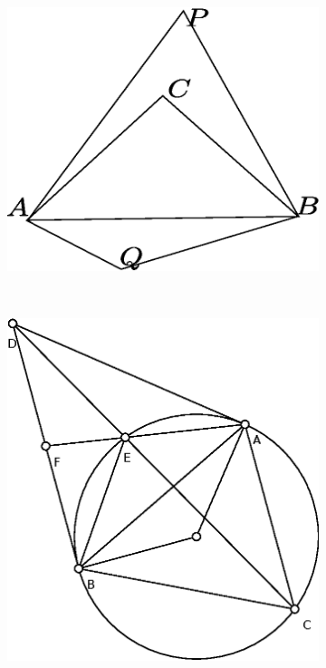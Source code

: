 \documentclass[12pt]{article}
\begin{document}
\begin{enumerate}
\begin{enumerate}[label=(\roman*)]
    \begin{figure}[!ht]
    \centering
    \begin{subfigure}[b]{0.45\textwidth}
    \includegraphics[width=\textwidth]{third_1.eps}
    \caption{}\label{fig:third_1}
    \end{subfigure}~
    \begin{subfigure}[b]{0.45\textwidth}
    \includegraphics[width=\textwidth]{area.eps}

\end{subfigure}
\end{figure}
\end{enumerate}
\end{enumerate}
\end{document}
